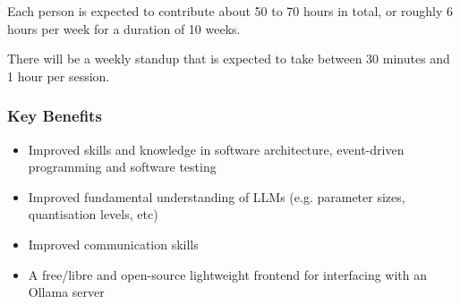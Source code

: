 Each person is expected to contribute about 50 to 70 hours in total, or roughly 6 hours per week for a duration of 10 weeks.

There will be a weekly standup that is expected to take between 30 minutes and 1 hour per session.

\subsubsection*{Key Benefits}

\begin{itemize}
    \item Improved skills and knowledge in software architecture, event-driven programming and software testing
    \item Improved fundamental understanding of LLMs (e.g. parameter sizes, quantisation levels, etc)
    \item Improved communication skills
    \item A free/libre and open-source lightweight frontend for interfacing with an Ollama server
\end{itemize}
